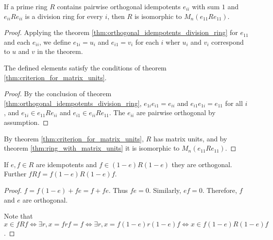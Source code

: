   \begin{theorem}
    \label{thm:orthogonal_idempotents_division_ring_matrix}
    If a prime ring $R$ contains pairwise orthogonal idempotents $e_{ii}$ with sum $1$ and $e_{ii}Re_{ii}$ is a division ring for every $i$, then $R$  is isomorphic to $M_n(e_{11}Re_{11})$.
  \end{theorem}
  \begin{proof}
    Applying the theorem \ref{thm:orthogonal_idempotents_division_ring} for $e_{11}$ and each $e_{ii}$, we define $e_{1i} = u_i$ and $e_{i1} = v_i$ for each $i$ wher $u_i$ and $v_i$ correspond to $u$ and $v$ in the theorem.
    \begin{claim}
      The defined elements satisfy the conditions of theorem \ref{thm:criterion_for_matrix_units}.
    \end{claim}
    \begin{proof}
      By the conclusion of theorem \ref{thm:orthogonal_idempotents_division_ring}, $e_{1i}e_{i1} = e_{ii}$ and $e_{i1}e_{1i} = e_{11}$ for all $i$, and $e_{1i} \in e_{11}Re_{ii}$ and $e_{i1} \in e_{ii}Re_{11}$. The $e_{ii}$ are pairwise orthogonal by assumption.
    \end{proof}
    By theorem \ref{thm:criterion_for_matrix_units}, $R$ has matrix units, and by theorem \ref{thm:ring_with_matrix_units} it is isomorphic to $M_n(e_{11}Re_{11})$.
  \end{proof}

  \begin{theorem}
    \label{thm:idempotents_orthogonal}
    If $e, f \in R$ are idempotents and $f \in (1-e)R(1-e)$ they are orthogonal. Further $fRf = f(1 - e) R (1 - e) f$.
  \end{theorem}
  \begin{proof}
    $f = f(1 - e) + fe = f + fe$. Thus $fe = 0$. Similarly, $ef = 0$. Therefore, $f$ and $e$ are orthogonal.

    Note that $x \in fRf \iff \exists r, x = f r f = f \iff \exists r, x = f(1 - e) r (1 - e) f \iff x \in f(1 - e) R (1 - e) f$. 
  \end{proof}


